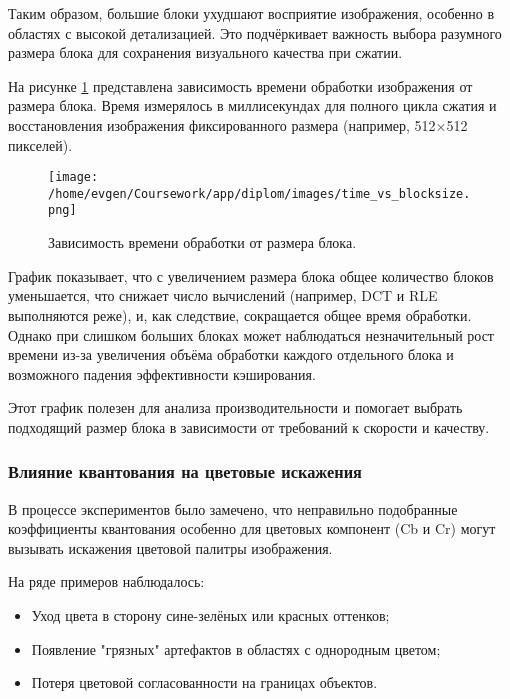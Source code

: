 Таким образом, большие блоки ухудшают восприятие изображения, особенно в областях с высокой детализацией. 
Это подчёркивает важность выбора разумного размера блока для сохранения визуального качества при сжатии.


На рисунке \ref{fig:time_vs_blocksize} представлена зависимость времени обработки изображения от размера блока. 
Время измерялось в миллисекундах для полного цикла сжатия и восстановления изображения фиксированного 
размера (например, 512×512 пикселей).

\begin{figure}[H]
    \centering
    \texttt{[image: /home/evgen/Coursework/app/diplom/images/time\_vs\_blocksize.png]}
    \caption{Зависимость времени обработки от размера блока.}
    \label{fig:time_vs_blocksize}
\end{figure}

График показывает, что с увеличением размера блока общее количество блоков уменьшается, 
что снижает число вычислений (например, DCT и RLE выполняются реже), и, как следствие, 
сокращается общее время обработки. 
Однако при слишком больших блоках может наблюдаться незначительный рост времени из-за увеличения объёма 
обработки каждого отдельного блока и возможного падения эффективности кэширования.

Этот график полезен для анализа производительности и помогает выбрать подходящий размер блока в 
зависимости от требований к скорости и качеству.



\subsubsection{Влияние квантования на цветовые искажения}

В процессе экспериментов было замечено, что неправильно подобранные коэффициенты квантования особенно для 
цветовых компонент (Cb и Cr) могут вызывать искажения цветовой палитры изображения.

На ряде примеров наблюдалось:

\begin{itemize}
    \item Уход цвета в сторону сине-зелёных или красных оттенков;
    \item Появление "грязных" артефактов в областях с однородным цветом;
    \item Потеря цветовой согласованности на границах объектов.
\end{itemize}


